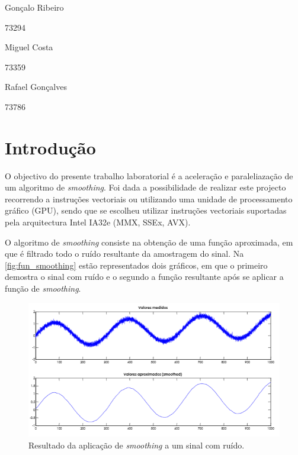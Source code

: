 \documentclass[a4paper]{article}
\begin{document}

	
	
	
	\trSetAuthors
	{
		\begin{center}
			Gonçalo Ribeiro

			73294
		\end{center}
	}{
		\begin{center}
			Miguel Costa

			73359
		\end{center}
	}{
		\begin{center}
			Rafael Gonçalves

			73786
		\end{center}
	}
		
	
	\trMakeCover
	
	\tableofcontents
	\pagebreak
	
	\section{Introdução}
	
	O objectivo do presente trabalho laboratorial é a aceleração e paraleliazação de um algoritmo de \textit{smoothing}. Foi dada a possibilidade de realizar este projecto recorrendo a instruções vectoriais ou utilizando uma unidade de processamento gráfico (GPU), sendo que se escolheu utilizar instruções vectoriais suportadas pela arquitectura Intel IA32e (MMX, SSEx, AVX).
	
	O algoritmo de \textit{smoothing} consiste na obtenção de uma função aproximada, em que é filtrado todo o ruído resultante da amostragem do sinal. Na \autoref{fig:fun_smoothing} estão representados dois gráficos, em que o primeiro demostra o sinal com ruído e o segundo a função resultante após se aplicar a função de \textit{smoothing}.
	
		\begin{figure}[h]
			\centering
			\includegraphics[width=1.\textwidth]{img/fun_smoothing}
			\caption{Resultado da aplicação de \textit{smoothing} a um sinal com ruído. }
			\label{fig:fun_smoothing}
		\end{figure}
		
\end{document}
